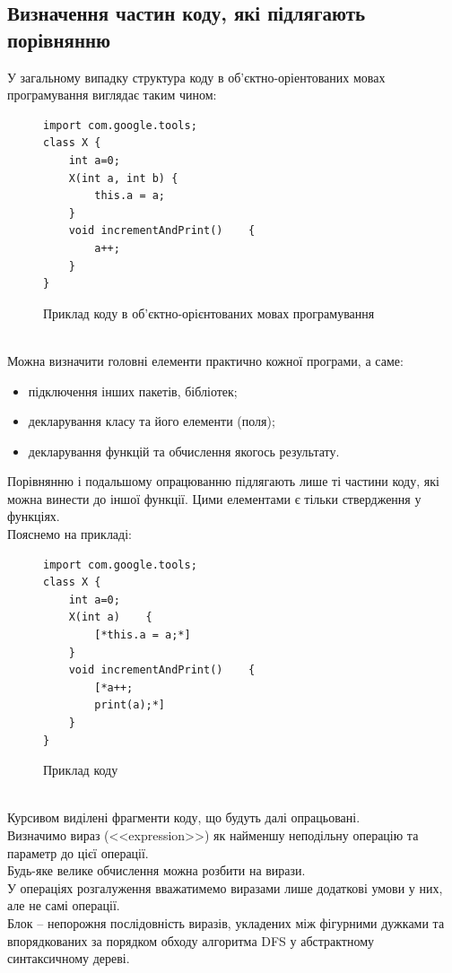 \documentclass[a4paper, 14pt]{article}
\begin{document}
\subsection{Визначення частин коду, які підлягають порівнянню}
У загальному випадку структура коду в об'єктно-оріентованих мовах програмування виглядає таким чином: \\
\begin{figure}[h!]
\begin{lstlisting}[frame=none, xleftmargin=.3\textwidth]
import com.google.tools;
class X {
	int a=0;
	X(int a, int b)	{
		this.a = a;
	}
	void incrementAndPrint()	{
		a++;
	}
}
\end{lstlisting}
\caption{Приклад коду в об'єктно-орієнтованих мовах програмування}
\end{figure} \\
Можна визначити головні елементи практично кожної програми, а саме:
\begin{itemize}
\item підключення інших пакетів, бібліотек;
\item декларування класу та його елементи (поля);
\item декларування функцій та обчислення якогось результату.
\end{itemize}
Порівнянню і подальшому опрацюванню підлягають лише ті частини коду, які можна винести до іншої функції.
Цими елементами є тільки ствердження у функціях.\\
Пояснемо на прикладі: \\
\begin{figure}[h!]
\begin{lstlisting}[frame=none, xleftmargin=.3\textwidth]
import com.google.tools;
class X {
	int a=0;
	X(int a)	{
		[*this.a = a;*]
	}
	void incrementAndPrint()	{
		[*a++;
		print(a);*]
	}
}
\end{lstlisting}
\caption{Приклад коду}
\end{figure} \\
Курсивом виділені фрагменти коду, що будуть далі опрацьовані. \\
Визначимо вираз (<<expression>>) як найменшу неподільну операцію та параметр до цієї операції. \\ Будь-яке велике обчислення можна розбити на вирази. \\
У операціях розгалуження вважатимемо виразами лише додаткові умови у них, але не самі операції. \\
Блок -- непорожня послідовність виразів, укладених між фігурними дужками та впорядкованих за порядком обходу алгоритма DFS у абстрактному синтаксичному дереві. \\
\end{document}
